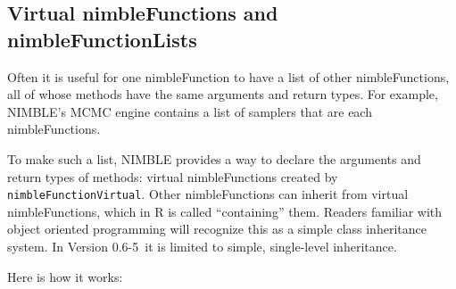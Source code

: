 \documentclass[12pt,oneside]{book}\usepackage[]{graphicx}\usepackage[]{color}
\def\cd#1{\texttt{#1}}
\newcommand{\ver}{0.6-5}
\begin{document}

\subsection{Virtual nimbleFunctions and nimbleFunctionLists}
\label{sec:virt-nimbl-nimbl}

Often it is useful for one nimbleFunction to have a list of other
nimbleFunctions, all of whose methods have the same arguments and return
types.  For example, NIMBLE's MCMC engine contains a list of samplers that
are each nimbleFunctions.

To make such a list, NIMBLE provides a way to declare the arguments
and return types of methods: virtual nimbleFunctions created by
\cd{nimbleFunctionVirtual}.  Other nimbleFunctions can inherit from
virtual nimbleFunctions, which in R is called ``containing'' them.
Readers familiar with object oriented programming will recognize this
as a simple class inheritance system.  In Version \ver\ it is limited to
simple, single-level inheritance.

Here is how it works:
\end{document}
